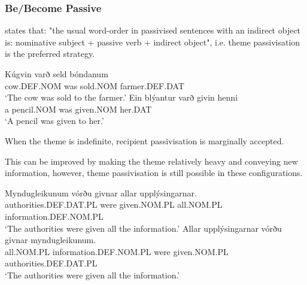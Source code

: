 \subsubsection{Be/Become Passive}
\cite[28]{Barnes.1986} states that: "the usual word-order in passivised sentences with an indirect object is: nominative subject + passive verb + indirect object", i.e. theme passivisation is the preferred strategy.
\begin{exe}
\ex 
\begin{xlist}
\ex \gll Kúgvin varð seld bóndanum\\
cow.DEF.NOM was sold.NOM farmer.DEF.DAT\\
\trans `The cow was sold to the farmer.' \citep[ex. 103]{Barnes.1986}
\ex \gll Ein blýantur varð givin henni\\
a pencil.NOM was given.NOM her.DAT\\
\trans `A pencil was given to her.' \citep[ex. 104]{Barnes.1986}
\end{xlist}
\end{exe}
When the theme is indefinite, recipient passivisation is marginally accepted.
\begin{exe}
\ex
\begin{xlist}
\end{xlist}
\end{exe}
This can be improved by making the theme relatively heavy and conveying new information, however, theme passivisation is still possible in these configurations.
\begin{exe}
\ex \gll Myndugleikunum vórðu givnar allar upplýsingarnar.\\
authorities.DEF.DAT.PL were given.NOM.PL all.NOM.PL information.DEF.NOM.PL\\
\trans `The authorities were given all the information.'
\ex \gll Allar upplýsingarnar vórðu givnar myndugleikunum.\\
all.NOM.PL information.DEF.NOM.PL were given.NOM.PL authorities.DEF.DAT.PL\\
\trans `The authorities were given all the information.'
\end{exe}
